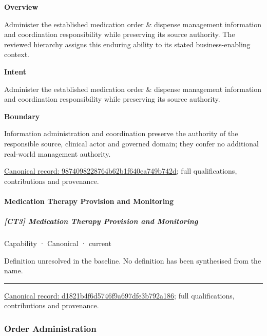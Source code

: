 \textbf{Overview}



Administer the established medication order \& dispense management information and coordination responsibility while preserving its source authority. The reviewed hierarchy assigns this enduring ability to its stated business-enabling context.



\textbf{Intent}



Administer the established medication order \& dispense management information and coordination responsibility while preserving its source authority.



\textbf{Boundary}



Information administration and coordination preserve the authority of the responsible source, clinical actor and governed domain; they confer no additional real-world management authority.


{\footnotesize \href{../../../../continuum/strategy/capability/9874098228764b62b1f640ea749b742d.md}{Canonical record: 9874098228764b62b1f640ea749b742d}; full qualifications, contributions and provenance.}\par
\paragraph{Medication Therapy Provision and Monitoring}

\subparagraph{[CT3] Medication Therapy Provision and Monitoring}

\label{element:d1821b4f6d5746f9a697dfe3b792a186}
{\small Capability · Canonical · current}\par

Definition unresolved in the baseline. No definition has been synthesised from the name.



\medskip\hrule\medskip

{\footnotesize \href{../../../../continuum/strategy/capability/d1821b4f6d5746f9a697dfe3b792a186.md}{Canonical record: d1821b4f6d5746f9a697dfe3b792a186}; full qualifications, contributions and provenance.}\par
\subsubsection{Order Administration}

